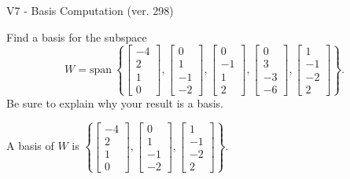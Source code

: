 \begin{exercise}
  \begin{exerciseTitle}V7 - Basis Computation (ver. 298)\end{exerciseTitle}
  \begin{exerciseStatement}
    Find a basis for the subspace 
\[W=\mathrm{span}\ \left\{\left[\begin{array}{r}
-4 \\
2 \\
1 \\
0
\end{array}\right] , \left[\begin{array}{r}
0 \\
1 \\
-1 \\
-2
\end{array}\right] , \left[\begin{array}{r}
0 \\
-1 \\
1 \\
2
\end{array}\right] , \left[\begin{array}{r}
0 \\
3 \\
-3 \\
-6
\end{array}\right] , \left[\begin{array}{r}
1 \\
-1 \\
-2 \\
2
\end{array}\right]\right\}.\]
 Be sure to explain why your result is a basis.


  \end{exerciseStatement}
  \begin{exerciseAnswer}
   A basis of \(W\) is  \(\left\{\left[\begin{array}{r}
-4 \\
2 \\
1 \\
0
\end{array}\right] , \left[\begin{array}{r}
0 \\
1 \\
-1 \\
-2
\end{array}\right] , \left[\begin{array}{r}
1 \\
-1 \\
-2 \\
2
\end{array}\right]\right\}\).
  


  \end{exerciseAnswer}
\end{exercise}